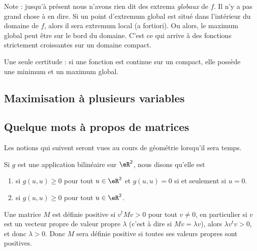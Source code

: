 Note : jusqu'à présent nous n'avons rien dit des extrema \emph{globaux} de $f$. Il n'y a pas grand chose à en dire. Si un point d'extremum global est situé dans l'intérieur du domaine de $f$, alors il sera extremum local (a fortiori). Ou alors, le maximum global peut être sur le bord du domaine. C'est ce qui arrive à des fonctions strictement croissantes sur un domaine compact.

Une seule certitude : si une fonction est continue sur un compact, elle possède une minimum et un maximum global.

					\subsection{Maximisation à plusieurs variables}

					\subsection{Quelque mots à propos de matrices}

Les notions qui suivent seront vues au cours de géométrie lorsqu'il sera temps. 

Si $g$ est une application bilinéaire sur $\eR^2$, nous disons qu'elle est
\begin{enumerate}

\item
{} si $g(u,u)\geq 0$ pour tout $u\in\eR^2$ et $g(u,u)=0$ si et seulement si $u=0$.

\item
{} si $g(u,u)\geq 0$ pour tout $u\in\eR^2$. 

\end{enumerate}

Une matrice $M$ est définie positive si $v^tMv>0$ pour tout $v\neq 0$, en particulier si $v$ est un vecteur propre de valeur propre $\lambda$ (c'est à dire si $Mv=\lambda v$), alors $\lambda v^tv>0$, et donc $\lambda>0$. Donc $M$ sera définie positive si toutes ses valeurs propres sont positives.

